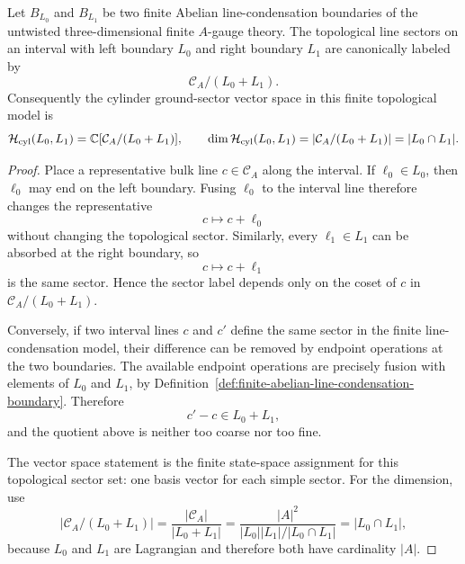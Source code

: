 \begin{theorem}
\label{thm:finite-abelian-boundary-cylinder-sectors}
Let \(B_{L_0}\) and \(B_{L_1}\) be two finite Abelian line-condensation
boundaries of the untwisted three-dimensional finite \(A\)-gauge theory.
The topological line sectors on an interval with left boundary \(L_0\) and
right boundary \(L_1\) are canonically labeled by
\begin{equation}
  \mathcal C_A/(L_0+L_1).
  \label{eq:finite-abelian-boundary-cylinder-quotient}
\end{equation}
Consequently the cylinder ground-sector vector space in this finite
topological model is
\begin{equation}
  \mathcal H_{\rm cyl}(L_0,L_1)
  =
  \mathbb C[\mathcal C_A/(L_0+L_1)],
  \qquad
  \dim\mathcal H_{\rm cyl}(L_0,L_1)
  =
  |\mathcal C_A/(L_0+L_1)|
  =
  |L_0\cap L_1|.
  \label{eq:finite-abelian-boundary-cylinder-dimension}
\end{equation}
\end{theorem}

\begin{proof}
Place a representative bulk line \(c\in\mathcal C_A\) along the interval.
If \(\ell_0\in L_0\), then \(\ell_0\) may end on the left boundary.  Fusing
\(\ell_0\) to the interval line therefore changes the representative
\[
  c\longmapsto c+\ell_0
\]
without changing the topological sector.  Similarly, every
\(\ell_1\in L_1\) can be absorbed at the right boundary, so
\[
  c\longmapsto c+\ell_1
\]
is the same sector.  Hence the sector label depends only on the coset of
\(c\) in \(\mathcal C_A/(L_0+L_1)\).

Conversely, if two interval lines \(c\) and \(c'\) define the same sector in
the finite line-condensation model, their difference can be removed by
endpoint operations at the two boundaries.  The available endpoint
operations are precisely fusion with elements of \(L_0\) and \(L_1\), by
Definition~\ref{def:finite-abelian-line-condensation-boundary}.  Therefore
\[
  c'-c\in L_0+L_1,
\]
and the quotient above is neither too coarse nor too fine.

The vector space statement is the finite state-space assignment for this
topological sector set: one basis vector for each simple sector.  For the
dimension, use
\[
  |\mathcal C_A/(L_0+L_1)|
  =
  \frac{|\mathcal C_A|}{|L_0+L_1|}
  =
  \frac{|A|^2}{|L_0||L_1|/|L_0\cap L_1|}
  =
  |L_0\cap L_1|,
\]
because \(L_0\) and \(L_1\) are Lagrangian and therefore both have
cardinality \(|A|\).
\end{proof}

